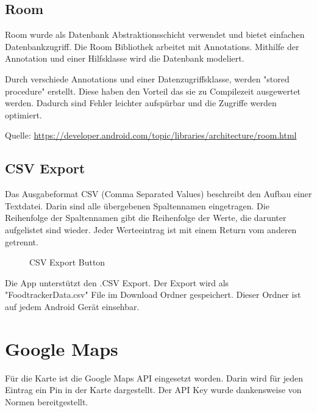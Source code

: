 \documentclass[
    DIV12,
    cleardouble=plain,
    headings=normal,
    pdftex,
    headexclude,footexclude,
    final
]{scrreprt}
\begin{document}
\subsection{Room}
Room wurde als Datenbank Abstraktionsschicht verwendet und bietet einfachen Datenbankzugriff. Die Room Bibliothek arbeitet mit Annotations. Mithilfe der Annotation und einer Hilfsklasse wird die Datenbank modeliert. 




Durch verschiede Annotations und einer Datenzugriffsklasse, werden "stored procedure" erstellt.
Diese haben den Vorteil das sie zu Compilezeit ausgewertet werden. Dadurch sind Fehler leichter aufspürbar und die Zugriffe werden optimiert.




Quelle:
\url{https://developer.android.com/topic/libraries/architecture/room.html}


\subsection{CSV Export}
Das Ausgabeformat CSV (Comma Separated Values) beschreibt den Aufbau einer Textdatei. Darin sind alle übergebenen Spaltennamen eingetragen. Die Reihenfolge der Spaltennamen gibt die Reihenfolge der Werte, die darunter aufgelistet sind wieder. Jeder Werteeintrag ist mit einem Return vom anderen getrennt.\\

\begin{figure}[H]
	\centering
	\caption{CSV Export Button}
	\label{csv_button}
\end{figure}

Die App unterstützt den .CSV Export. Der Export wird als "FoodtrackerData.csv" File im Download Ordner gespeichert.
Dieser Ordner ist auf jedem Android Gerät einsehbar.



\section{Google Maps}
Für die Karte ist die Google Maps API eingesetzt worden. Darin wird für jeden Eintrag ein Pin in der Karte dargestellt.
Der API Key wurde dankensweise von Normen bereitgestellt.
\end{document}
